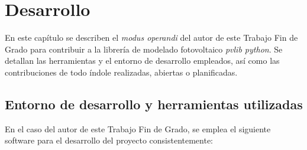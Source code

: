 \chapter{Desarrollo} \label{chp:desarrollo}

En este capítulo se describen el \textit{modus operandi} del autor de este Trabajo Fin de Grado para contribuir a la librería de modelado fotovoltaico \textit{pvlib python}. Se detallan las herramientas y el entorno de desarrollo empleados, así como las contribuciones de todo índole realizadas, abiertas o planificadas.

\section{Entorno de desarrollo y herramientas utilizadas} \label{sct:desarrollo:entorno}

En el caso del autor de este Trabajo Fin de Grado, se emplea el siguiente software para el desarrollo del proyecto consistentemente:

